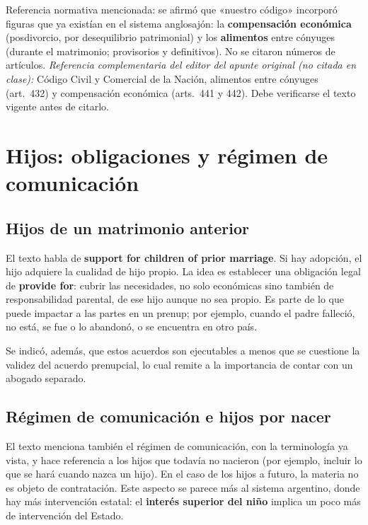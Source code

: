 \documentclass[12pt,oneside]{book}
\begin{document}
\begin{note}
Referencia normativa mencionada: se afirmó que «nuestro código» incorporó figuras que ya existían en el sistema anglosajón: la \textbf{compensación económica} (posdivorcio, por desequilibrio patrimonial) y los \textbf{alimentos} entre cónyuges (durante el matrimonio; provisorios y definitivos). No se citaron números de artículos. \textit{Referencia complementaria del editor del apunte original (no citada en clase):} Código Civil y Comercial de la Nación, alimentos entre cónyuges (art.~432) y compensación económica (arts.~441 y 442). Debe verificarse el texto vigente antes de citarlo.
\end{note}

\section{Hijos: obligaciones y régimen de comunicación}

\subsection{Hijos de un matrimonio anterior}

El texto habla de \textbf{support for children of prior marriage}. Si hay adopción, el hijo adquiere la cualidad de hijo propio. La idea es establecer una obligación legal de \textbf{provide for}: cubrir las necesidades, no solo económicas sino también de responsabilidad parental, de ese hijo aunque no sea propio. Es parte de lo que puede impactar a las partes en un prenup; por ejemplo, cuando el padre falleció, no está, se fue o lo abandonó, o se encuentra en otro país.

Se indicó, además, que estos acuerdos son ejecutables a menos que se cuestione la validez del acuerdo prenupcial, lo cual remite a la importancia de contar con un abogado separado.

\subsection{Régimen de comunicación e hijos por nacer}

El texto menciona también el régimen de comunicación, con la terminología ya vista, y hace referencia a los hijos que todavía no nacieron (por ejemplo, incluir lo que se hará cuando nazca un hijo). En el caso de los hijos a futuro, la materia no es objeto de contratación. Este aspecto se parece más al sistema argentino, donde hay más intervención estatal: el \textbf{interés superior del niño} implica un poco más de intervención del Estado.
\end{document}
